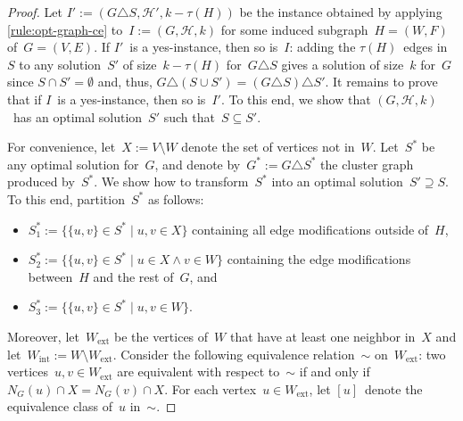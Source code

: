 \documentclass[envcountsame,numbook,smallextended]{svjour3}
\numberwithin{equation}{section}
\numberwithin{figure}{section}
\newcommand{\symdiff}{\triangle}
\newcommand{\packing}{\ensuremath{\mathcal H}}
\newcommand{\Wext}{\ensuremath{W_\text{ext}}}
\newcommand{\Wint}{\ensuremath{W_\text{int}}}
\begin{document}
\begin{proof}
  Let \(I':=(G\symdiff S,\packing',k-\tau(H))\) be
  the instance obtained by applying 
  \cref{rule:opt-graph-ce} to~$I:=(G,\packing,k)$
  for some induced subgraph~\(H=(W,F)\) of~\(G=(V,E)\).
  If \(I'\)~is a yes-instance, then so is~\(I\):
  adding the \(\tau(H)\)~edges in~\(S\)
  to any solution~\(S'\) of size~\(k-\tau(H)\)
  for~\(G\symdiff S\)
  gives a solution of size~\(k\)
  for~\(G\)
  since \(S\cap S'=\emptyset\)
  and, thus,
  \(G\symdiff (S\cup S')=(G\symdiff S)\symdiff S'\).
  It remains to prove that
  if \(I\)~is a yes-instance,
  then so is~\(I'\).
  To this end, we show that
  $(G,\packing,k)$~has an optimal solution~$S'$
  such that~$S\subseteq S'$. 

  For convenience,
  let~$X:=V\setminus W$ denote
  the set of vertices not in~$W$.
  Let~$S^*$ be any optimal solution for~$G$,
  and denote by~$G^*:=G\symdiff{} S^*$
  the cluster graph produced by~$S^*$.
  We show how to transform~$S^*$
  into an optimal solution~$S'\supseteq S$.
  To this end,
  partition~$S^*$ as follows:
  \begin{itemize}
  \item $S^*_1:=\{\{u,v\}\in S^*\mid u,v\in X\}$ containing
    all edge modifications outside of~$H$,
  \item $S^*_2:=\{\{u,v\}\in S^*\mid u\in X \wedge v\in W\}$
    containing the edge modifications between~$H$ and the rest of~$G$, and
  \item $S^*_3:=\{\{u,v\}\in S^*\mid u,v\in W\}$.
  \end{itemize}
  Moreover, let~$\Wext$ be the vertices of~$W$
  that have at least one neighbor in~$X$
  and let~$\Wint:=W\setminus \Wext$.
  Consider the following equivalence relation~$\sim$
  on~$\Wext$: two vertices~$u,v\in \Wext$ are equivalent with respect to~\(\sim\) if and only
  if~$N_G(u)\cap X = N_G(v)\cap X$.  For each vertex~$u\in \Wext$, let $[u]$~denote the
  equivalence class of~$u$ in~$\sim$.
  



\end{proof}
\end{document}
